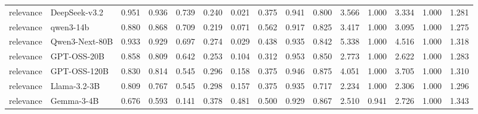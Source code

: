 \begin{table}[t]
{\begin{tabular}{llrrrrrrrrrrrrr}
relevance & DeepSeek-v3.2 & 0.951 & 0.936 & 0.739 & 0.240 & 0.021 & 0.375 & 0.941 & 0.800 & 3.566 & 1.000 & 3.334 & 1.000 & 1.281 \\
relevance & qwen3-14b & 0.880 & 0.868 & 0.709 & 0.219 & 0.071 & 0.562 & 0.917 & 0.825 & 3.417 & 1.000 & 3.095 & 1.000 & 1.275 \\
relevance & Qwen3-Next-80B & 0.933 & 0.929 & 0.697 & 0.274 & 0.029 & 0.438 & 0.935 & 0.842 & 5.338 & 1.000 & 4.516 & 1.000 & 1.318 \\
relevance & GPT-OSS-20B & 0.858 & 0.809 & 0.642 & 0.253 & 0.104 & 0.312 & 0.953 & 0.850 & 2.773 & 1.000 & 2.622 & 1.000 & 1.283 \\
relevance & GPT-OSS-120B & 0.830 & 0.814 & 0.545 & 0.296 & 0.158 & 0.375 & 0.946 & 0.875 & 4.051 & 1.000 & 3.705 & 1.000 & 1.310 \\
relevance & Llama-3.2-3B & 0.809 & 0.767 & 0.545 & 0.298 & 0.157 & 0.375 & 0.935 & 0.717 & 2.234 & 1.000 & 2.306 & 1.000 & 1.296 \\
relevance & Gemma-3-4B & 0.676 & 0.593 & 0.141 & 0.378 & 0.481 & 0.500 & 0.929 & 0.867 & 2.510 & 0.941 & 2.726 & 1.000 & 1.343 \\
\bottomrule
\end{tabular}
}
\end{table}